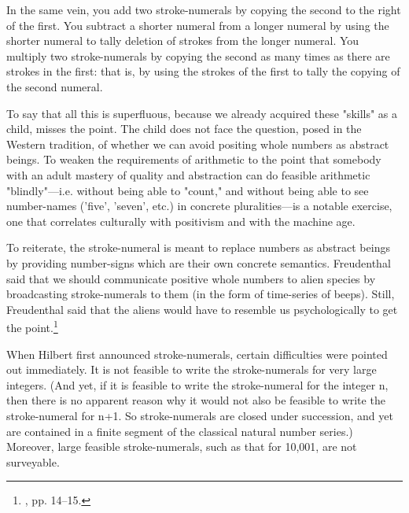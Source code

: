 In the same vein, you add two stroke-numerals by copying the 
second to the right of the first. You subtract a shorter numeral from a 
longer numeral by using the shorter numeral to tally deletion of strokes 
from the longer numeral. You multiply two stroke-numerals by copying the second as many times as there are strokes in the first: that is, by 
using the strokes of the first to tally the copying of the second numeral. 

To say that all this is superfluous, because we already acquired 
these "skills" as a child, misses the point. The child does not face the 
question, posed in the Western tradition, of whether we can avoid 
positing whole numbers as abstract beings. To weaken the requirements 
of arithmetic to the point that somebody with an adult mastery 
of quality and abstraction can do feasible arithmetic "blindly"---i.e. 
without being able to "count," and without being able to see number-names 
('five', 'seven', etc.) in concrete pluralities---is a notable exercise, 
one that correlates culturally with positivism and with the machine age. 

To reiterate, the stroke-numeral is meant to replace numbers as 
abstract beings by providing number-signs which are their own concrete 
semantics. Freudenthal said that we should communicate positive 
whole numbers to alien species by broadcasting stroke-numerals to 
them (in the form of time-series of beeps). Still, Freudenthal said that 
the aliens would have to resemble us psychologically to get the point.\footnote{, pp. 14--15.} 

When Hilbert first announced stroke-numerals, certain difficulties 
were pointed out immediately. It is not feasible to write the 
stroke-numerals for very large integers. (And yet, if it is feasible to write the 
stroke-numeral for the integer n, then there is no apparent reason why 
it would not also be feasible to write the stroke-numeral for n+1. So 
stroke-numerals are closed under succession, and yet are contained in a
finite segment of the classical natural number series.) Moreover, large 
feasible stroke-numerals, such as that for 10,001, are not surveyable. 

